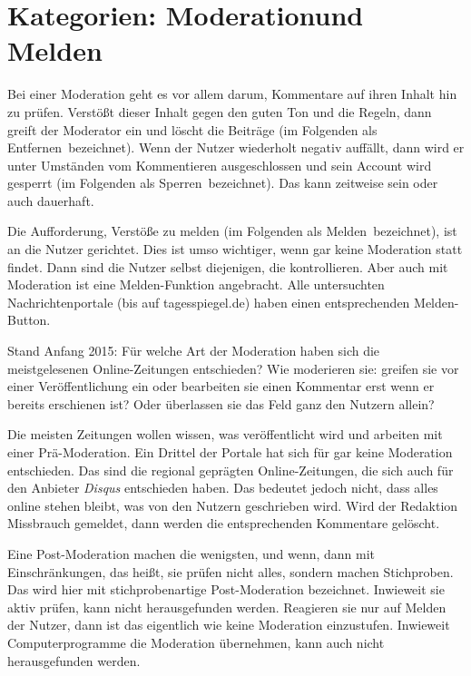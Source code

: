 \section{Kategorien: \glqq Moderation\grqq und \glqq Melden\grqq}

Bei einer Moderation geht es vor allem darum, Kommentare auf ihren Inhalt hin zu
prüfen. Verstößt dieser Inhalt gegen den guten Ton und die Regeln, dann greift
der Moderator ein und löscht die Beiträge (im Folgenden als \glqq
Entfernen\grqq\ bezeichnet). Wenn der Nutzer wiederholt negativ auffällt, dann
wird er unter Umständen vom Kommentieren ausgeschlossen und sein Account wird
gesperrt (im Folgenden als  \glqq Sperren\grqq\ bezeichnet). Das kann zeitweise
sein oder auch dauerhaft.

Die Aufforderung, Verstöße zu melden (im Folgenden als \glqq Melden\grqq\
bezeichnet), ist an die Nutzer gerichtet. Dies ist umso wichtiger, wenn gar
keine Moderation statt findet. Dann sind die Nutzer selbst diejenigen, die
kontrollieren. Aber auch mit Moderation ist eine Melden-Funktion angebracht.
Alle  untersuchten Nachrichtenportale (bis auf tagesspiegel.de) haben einen
entsprechenden Melden-Button.

Stand Anfang 2015: Für welche Art der Moderation haben sich die meistgelesenen
Online-Zeitungen entschieden? Wie moderieren sie: greifen sie vor einer
Veröffentlichung ein oder bearbeiten sie einen Kommentar erst wenn er bereits
erschienen ist? Oder überlassen sie das Feld ganz den Nutzern allein?

Die meisten Zeitungen wollen wissen, was veröffentlicht wird und arbeiten mit
einer Prä-Moderation.  Ein Drittel der Portale hat sich für gar keine Moderation
entschieden. Das sind die regional geprägten Online-Zeitungen, die sich auch für
den Anbieter {\slshape Disqus} entschieden haben. Das bedeutet jedoch nicht,
dass alles online stehen bleibt, was von den Nutzern geschrieben wird.  Wird der
Redaktion Missbrauch gemeldet, dann werden die entsprechenden Kommentare
gelöscht.

Eine Post-Moderation machen die wenigsten, und wenn, dann mit Einschränkungen,
das heißt, sie prüfen nicht alles, sondern machen Stichproben. Das wird hier mit
\glqq stichprobenartige Post-Moderation\grqq{} bezeichnet. Inwieweit sie aktiv
prüfen, kann nicht herausgefunden werden. Reagieren sie nur auf Melden der
Nutzer, dann ist das eigentlich wie \glqq keine Moderation\grqq{} einzustufen.
Inwieweit Computerprogramme die Moderation übernehmen, kann auch nicht
herausgefunden werden.

